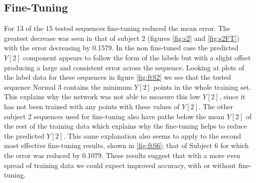 \documentclass[11pt]{article} %
\begin{document}
\subsection{Fine-Tuning}
\label{sec:finetuning}
For 13 of the 15 tested sequences fine-tuning reduced the mean error. The greatest decrease was seen in that of subject 2 (figures \ref{fig:s2} and \ref{fig:s2FT}) with the error decreasing by 0.1579. In the non fine-tuned case the predicted $Y[2]$ component appears to follow the form of the labels but with a slight offset producing a large and consistent error across the sequence. Looking at plots of the label data for these sequences in figure \ref{fig:ftS2} we see that the tested sequence Normal 3 contains the minimum $Y[2]$ points in the whole training set. This explains why the network was not able to measure this low $Y[2]$, since it has not been trained with any points with these values of $Y[2]$. The other subject 2 sequences used for fine-tuning also have paths below the mean $Y[2]$ of the rest of the training data which explains why the fine-tuning helps to reduce the predicted $Y[2]$. This same explanation also seems to apply to the second most effective fine-tuning results, shown in \ref{fig:ftS6}; that of Subject 6 for which the error was reduced by 0.1079. These results suggest that with a more even spread of training data we could expect improved accuracy, with or without fine-tuning.
\end{document}
